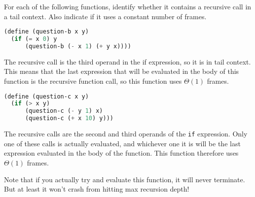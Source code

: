 \question
For each of the following functions, identify whether it contains a recursive
call in a tail context. Also indicate if it uses a constant number of frames.


\begin{minipage}{\linewidth}
\begin{lstlisting}[language=Scheme]
(define (question-b x y)
  (if (= x 0) y
      (question-b (- x 1) (+ y x))))
\end{lstlisting}
\end{minipage}
\begin{solution}[0in]
The recursive call is the third operand in the if expression, so it is in tail
context. This means that the last expression that will be evaluated in the body
of this function is the recursive function call, so this function uses
$\Theta(1)$ frames.
\end{solution}

\begin{minipage}{\linewidth}
\begin{lstlisting}[language=Scheme]
(define (question-c x y)
  (if (> x y)
      (question-c (- y 1) x)
      (question-c (+ x 10) y)))
\end{lstlisting}
\end{minipage}
\begin{solution}[0in]
The recursive calls are the second and third operands of the \texttt{if}
expression. Only one of these calls is actually evaluated, and whichever one it
is will be the last expression evaluated in the body of the function.  This
function therefore uses $\Theta(1)$ frames.

Note that if you actually try and evaluate this function, it will never
terminate. But at least it won't crash from hitting max recursion depth!
\end{solution}

